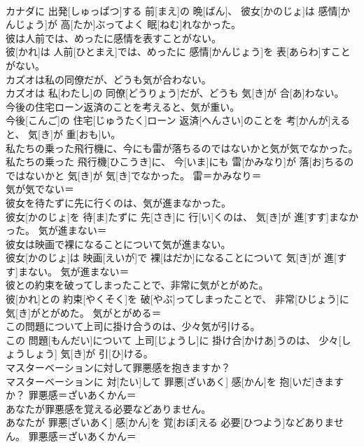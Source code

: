 \documentclass[8pt]{extreport}
\begin{document}
\begin{CJK}{UTF8}{min}
\\	カナダに 出発[しゅっぱつ]する 前[まえ]の 晩[ばん]、 彼女[かのじょ]は 感情[かんじょう]が 高[たか]ぶってよく 眠[ねむ]れなかった。	
\\	彼は人前では、めったに感情を表すことがない。	
\\	彼[かれ]は 人前[ひとまえ]では、めったに 感情[かんじょう]を 表[あらわ]すことがない。	
\\	カズオは私の同僚だが、どうも気が合わない。	
\\	カズオは 私[わたし]の 同僚[どうりょう]だが、どうも 気[き]が 合[あ]わない。	
\\	今後の住宅ローン返済のことを考えると、気が重い。	
\\	今後[こんご]の 住宅[じゅうたく]ローン 返済[へんさい]のことを 考[かんが]えると、 気[き]が 重[おも]い。	
\\	私たちの乗った飛行機に、今にも雷が落ちるのではないかと気が気でなかった。	
\\	私たちの乗った 飛行機[ひこうき]に、 今[いま]にも 雷[かみなり]が 落[お]ちるのではないかと 気[き]が 気[き]でなかった。	雷＝かみなり＝ 
\\	気が気でない＝ 
\\	彼女を待たずに先に行くのは、気が進まなかった。	
\\	彼女[かのじょ]を 待[ま]たずに 先[さき]に 行[い]くのは、 気[き]が 進[すす]まなかった。	気が進まない＝ 
\\	彼女は映画で裸になることについて気が進まない。	
\\	彼女[かのじょ]は 映画[えいが]で 裸[はだか]になることについて 気[き]が 進[すす]まない。	気が進まない＝ 
\\	彼との約束を破ってしまったことで、非常に気がとがめた。	
\\	彼[かれ]との 約束[やくそく]を 破[やぶ]ってしまったことで、 非常[ひじょう]に 気[き]がとがめた。	気がとがめる＝ 
\\	この問題について上司に掛け合うのは、少々気が引ける。	
\\	この 問題[もんだい]について 上司[じょうし]に 掛け合[かけあ]うのは、 少々[しょうしょう] 気[き]が 引[ひ]ける。	
\\	マスターベーションに対して罪悪感を抱きますか？	
\\	マスターベーションに 対[たい]して 罪悪[ざいあく] 感[かん]を 抱[いだ]きますか？	罪悪感＝ざいあくかん＝ 
\\	あなたが罪悪感を覚える必要などありません。	
\\	あなたが 罪悪[ざいあく] 感[かん]を 覚[おぼ]える 必要[ひつよう]などありません。	罪悪感＝ざいあくかん＝ 

\end{CJK}
\end{document}
